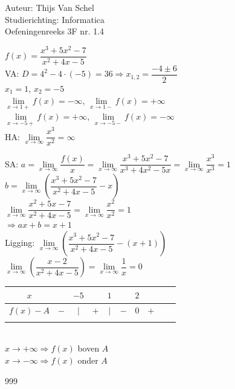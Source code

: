\documentclass[a4paper]{article}
\begin{document}
  
\noindent \large Auteur: Thijs Van Schel \\
\noindent \large Studierichting: Informatica\\
\noindent \large Oefeningenreeks 3F nr. 1.4\\

\medskip

\normalsize

$f(x)=\dfrac{x^3+5x^2-7}{x^2+4x-5}$\\

VA: $D=4^2-4\cdot (-5) = 36 \Rightarrow x_{1,2} = \dfrac{-4 \pm6}{2}$\\

$x_1 = 1$, $x_2 = -5$\\

$\lim\limits_{x\rightarrow 1+} f(x) = -\infty$, $\lim\limits_{x\rightarrow 1-} f(x) = +\infty$\\

$\lim\limits_{x\rightarrow -5+} f(x) = +\infty$, $\lim\limits_{x\rightarrow -5-} f(x) = -\infty$\\

HA: $\lim\limits_{x\rightarrow \infty} \dfrac{x^3}{x^2} = \infty$

SA: $a = \lim\limits_{x\rightarrow \infty} \dfrac{f(x)}{x} = \lim\limits_{x\rightarrow \infty} \dfrac{x^3+5x^2-7}{x^3+4x^2-5x}= \lim\limits_{x\rightarrow \infty} \dfrac{x^3}{x^3} = 1$\\

$b = \lim\limits_{x\rightarrow \infty}\left(\dfrac{x^3+5x^2-7}{x^2+4x-5}  - x\right)$\\

$\lim\limits_{x\rightarrow \infty}\dfrac{x^2+5x-7}{x^2+4x-5} = \lim\limits_{x\rightarrow \infty} \dfrac{x^2}{x^2} = 1$\\

$\Rightarrow ax+b = x+1$\\

Ligging: $\lim\limits_{x\rightarrow \infty} \left(\dfrac{x^3+5x^2-7}{x^2+4x-5} - (x+1)\right)$\\

$\lim\limits_{x\rightarrow \infty}\left(\dfrac{x-2}{x^2+4x-5}\right) = \lim\limits_{x\rightarrow \infty} \dfrac{1}{x} = 0$ 

\begin{tabular}{c|ccccccccc}
$x$ &  & $-5$ & & $1$ & & $2$ &\\ \hline
$f(x)-A$ & $-$  & $|$ & $+$ & $|$ & $-$ & $0$ & $+$\\ 
& &  &  &  &  & & \\
\end{tabular}\\

$x \to +\infty \Rightarrow f(x)$ boven $A$\\

$x \to -\infty \Rightarrow f(x)$ onder $A$

\begin{thebibliography}{999}
\end{thebibliography}
\end{document}
